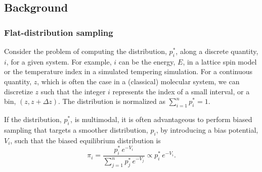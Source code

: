 \documentclass[reprint, superscriptaddress, floatfix]{revtex4-1}
\begin{document}
\subsection{\label{sec:background}
Background}



\subsubsection{\label{sec:FDS}
Flat-distribution sampling}



Consider the problem of computing
the distribution, $p^*_i$,
along a discrete quantity, $i$,
for a given system.
%
%
For example, $i$ can be the energy, $E$,
in a lattice spin model or the temperature index
in a simulated tempering simulation\cite{
marinari1992, *lyubartsev1992}.
%
For a continuous quantity, $z$,
which is often the case in a (classical) molecular system,
we can discretize $z$
such that the integer $i$ represents
the index of a small interval, or a bin,
$(z, z + \Delta z)$.
%
The distribution is normalized as
$\sum_{i = 1}^n p^*_i = 1$.



%
If the distribution, $p^*_i$, is multimodal,
it is often advantageous to perform
biased sampling that targets
a smoother distribution, $p_i$,
by introducing a bias potential, $V_i$,
such that the biased equilibrium distribution is
%
\begin{equation}
  \pi_i
  =
  \frac{                p^*_i \, e^{-V_i} }
       { \sum_{j = 1}^n p^*_j \, e^{-V_j} }
  \propto
  p^*_i \, e^{-V_i}
  .
  \label{eq:pi_p_V}
\end{equation}
%
%
\end{document}
